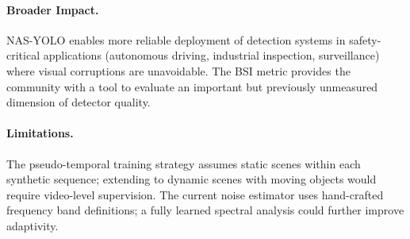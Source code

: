 \documentclass[review]{eccv2026}
\begin{document}
\paragraph{Broader Impact.}
NAS-YOLO enables more reliable deployment of detection systems in safety-critical applications (autonomous driving, industrial inspection, surveillance) where visual corruptions are unavoidable.
The BSI metric provides the community with a tool to evaluate an important but previously unmeasured dimension of detector quality.

\paragraph{Limitations.}
The pseudo-temporal training strategy assumes static scenes within each synthetic sequence; extending to dynamic scenes with moving objects would require video-level supervision.
The current noise estimator uses hand-crafted frequency band definitions; a fully learned spectral analysis could further improve adaptivity.

{\small


}
\end{document}
